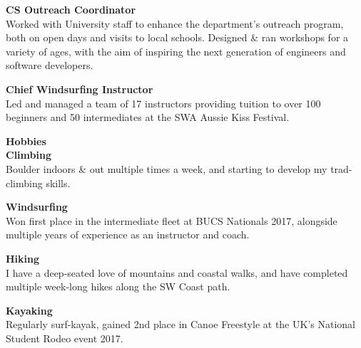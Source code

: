 \documentclass[10pt]{article}
\newcommand{\bold}[1]{\textbf{\textcolor{dark}{#1}}}
\newcommand{\sect}[1]{{\LARGE\bold{#1}}\vspace{0.2em}\\}
\newcommand{\xx}[2]{{\large\bold{#1}}\\{#2}\vspace{0.5em}}
\begin{document}
\begin{minipage}[t]{0.33\textwidth}
\xx{CS Outreach Coordinator}
{Worked with University staff to enhance the department's outreach program, both on open days and visits to local schools. 
Designed \& ran workshops for a variety of ages, with the aim of inspiring the next generation of engineers and software developers.}

\xx{Chief Windsurfing Instructor}
{Led and managed a team of 17 instructors providing tuition to over 100 beginners and 50 intermediates at the SWA Aussie Kiss Festival.}


\vspace{0.4em}
\sect{Hobbies}

\xx{Climbing}
{Boulder indoors \& out multiple times a week, and starting to develop my trad-climbing skills.}

\xx{Windsurfing}
{Won first place in the intermediate fleet at BUCS Nationals 2017, alongside multiple years of experience as an instructor and coach.}

\xx{Hiking}
{I have a deep-seated love of mountains and coastal walks, and have completed multiple week-long hikes along the SW Coast path.}

\xx{Kayaking}
{Regularly surf-kayak, gained 2nd place in Canoe Freestyle at the UK's National Student Rodeo event 2017.}

\end{minipage} 
\hfill
%
%
%
%
\end{document}

